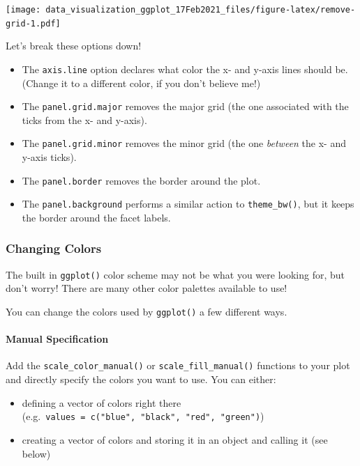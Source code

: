\documentclass[
]{article}
\providecommand{\tightlist}{%
  \setlength{\itemsep}{0pt}\setlength{\parskip}{0pt}}
\begin{document}
\texttt{[image: data\_visualization\_ggplot\_17Feb2021\_files/figure-latex/remove-grid-1.pdf]}

Let's break these options down!

\begin{itemize}
\tightlist
\item
  The \texttt{axis.line} option declares what color the x- and y-axis
  lines should be. (Change it to a different color, if you don't believe
  me!)
\item
  The \texttt{panel.grid.major} removes the major grid (the one
  associated with the ticks from the x- and y-axis).\\
\item
  The \texttt{panel.grid.minor} removes the minor grid (the one
  \emph{between} the x- and y-axis ticks).\\
\item
  The \texttt{panel.border} removes the border around the plot.\\
\item
  The \texttt{panel.background} performs a similar action to
  \texttt{theme\_bw()}, but it keeps the border around the facet labels.
\end{itemize}

\hypertarget{changing-colors}{%
\subsubsection{Changing Colors}\label{changing-colors}}

The built in \texttt{ggplot()} color scheme may not be what you were
looking for, but don't worry! There are many other color palettes
available to use!

You can change the colors used by \texttt{ggplot()} a few different
ways.

\hypertarget{manual-specification}{%
\paragraph{Manual Specification}\label{manual-specification}}

Add the \texttt{scale\_color\_manual()} or
\texttt{scale\_fill\_manual()} functions to your plot and directly
specify the colors you want to use. You can either:

\begin{itemize}
\item
  defining a vector of colors right there
  (e.g.~\texttt{values\ =\ c("blue",\ "black",\ "red",\ "green")})
\item
  creating a vector of colors and storing it in an object and calling it
  (see below)
\end{itemize}
\end{document}
